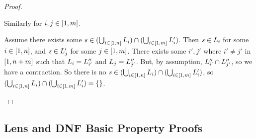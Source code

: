\documentclass[numbers,10pt,preprint\ifanon ,nocopyrightspace\fi]{sigplanconf}
\begin{document}
\begin{proof}
\begin{case}[$\Leftarrow$]
    Similarly for $i,j\in[1,m]$.

    Assume there exists some $\mathit{s} \in
    (\bigcup_{i\in[1,n]}L_i) \cap
    (\bigcup_{i\in[1,m]}L_i')$.
    Then $\mathit{s}\in L_i$ for some $i\in[1,n]$, and
    $\mathit{s}\in L_j'$ for some $j\in[1,m]$.
    There exists some $i',j'$ where $i' \neq j'$ in $[1,n+m]$
    such that $L_i = L_{i'}''$ and
    $L_j = L_{j'}''$.  But, by assumption,
    $L_{i'}'' \cap L_{j'}''$, so we have a contraction.
    So there is no $\mathit{s} \in (\bigcup_{i\in[1,n]}L_i)
    \cap (\bigcup_{i\in[1,m]}L_i')$, so
    $(\bigcup_{i\in[1,n]}L_i) \cap
    (\bigcup_{i\in[1,m]}L_i') = \{\}$.
  \end{case}
\end{proof}

\subsection{Lens and DNF Basic Property Proofs}
\end{document}
